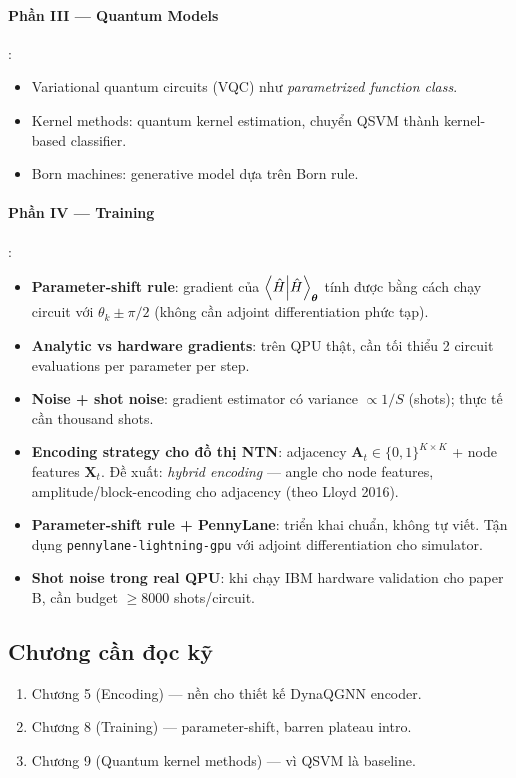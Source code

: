 \documentclass[11pt,a4paper]{article}
\begin{document}
\paragraph{Phần III --- Quantum Models}:
\begin{itemize}
  \item Variational quantum circuits (VQC) như \textit{parametrized function class}.
  \item Kernel methods: quantum kernel estimation, chuyển QSVM thành kernel-based classifier.
  \item Born machines: generative model dựa trên Born rule.
\end{itemize}

\paragraph{Phần IV --- Training}:
\begin{itemize}
  \item \textbf{Parameter-shift rule}: gradient của $\braket{\hat{H}}_{\boldsymbol{\theta}}$ tính được bằng cách chạy circuit với $\theta_k \pm \pi/2$ (không cần adjoint differentiation phức tạp).
  \item \textbf{Analytic vs hardware gradients}: trên QPU thật, cần tối thiểu 2 circuit evaluations per parameter per step.
  \item \textbf{Noise + shot noise}: gradient estimator có variance $\propto 1/S$ (shots); thực tế cần thousand shots.
\end{itemize}

\begin{take}
\begin{itemize}
  \item \textbf{Encoding strategy cho đồ thị NTN}: adjacency $\mathbf{A}_t \in \{0,1\}^{K \times K}$ + node features $\mathbf{X}_t$. Đề xuất: \textit{hybrid encoding} --- angle cho node features, amplitude/block-encoding cho adjacency (theo Lloyd 2016).
  \item \textbf{Parameter-shift rule + PennyLane}: triển khai chuẩn, không tự viết. Tận dụng \texttt{pennylane-lightning-gpu} với adjoint differentiation cho simulator.
  \item \textbf{Shot noise trong real QPU}: khi chạy IBM hardware validation cho paper B, cần budget $\geq 8000$ shots/circuit.
\end{itemize}
\end{take}

\subsection{Chương cần đọc kỹ}
\begin{enumerate}
  \item Chương 5 (Encoding) --- nền cho thiết kế DynaQGNN encoder.
  \item Chương 8 (Training) --- parameter-shift, barren plateau intro.
  \item Chương 9 (Quantum kernel methods) --- vì QSVM là baseline.
\end{enumerate}
\end{document}
